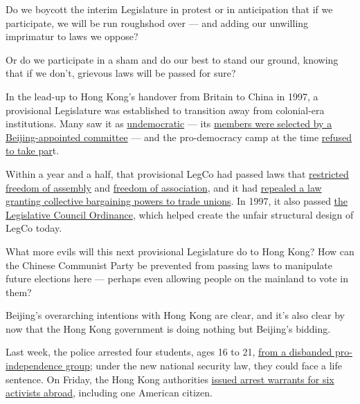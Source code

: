 Do we boycott the interim Legislature in protest or in anticipation that
if we participate, we will be run roughshod over --- and adding our
unwilling imprimatur to laws we oppose?

Or do we participate in a sham and do our best to stand our ground,
knowing that if we don't, grievous laws will be passed for sure?

In the lead-up to Hong Kong's handover from Britain to China in 1997, a
provisional Legislature was established to transition away from
colonial-era institutions. Many saw it as
\href{https://www.hrw.org/legacy/press/pro-legi.htm}{undemocratic} ---
its
\href{https://www.scmp.com/news/hong-kong/education-community/article/2012978/explained-how-hong-kongs-legislative-council-has}{members
were selected by a Beijing-appointed committee} --- and the
pro-democracy camp at the time
\href{http://www.ipsnews.net/1996/12/hong-kong-two-legislatures-one-in-hong-kong-one-in-shenzhen/}{refused
to take par}t.

Within a year and a half, that provisional LegCo had passed laws that
\href{https://www.justicecentre.org.hk/framework/uploads/2018/11/HKUPR-Coalition-Fact-Sheet-Freedom-of-Assembly-Rights-and-Public-Order-Ordinance.pdf}{restricted
freedom of assembly} and
\href{https://hongkongfp.com/2018/07/19/explainer-hong-kong-seeking-ban-pro-independence-party-using-existing-national-security-laws/}{freedom
of association}, and it had
\href{https://www.legco.gov.hk/yr98-99/chinese/hc/papers/hc2711-m1-ec.pdf}{repealed
a law granting collective bargaining powers to trade unions}. In 1997,
it also passed
\href{https://www.legco.gov.hk/general/chinese/procedur/companion/chapter_3/mcp-part1-ch3-n11-ce.pdf}{the
Legislative Council Ordinance}, which helped create the unfair
structural design of LegCo today.

What more evils will this next provisional Legislature do to Hong Kong?
How can the Chinese Communist Party be prevented from passing laws to
manipulate future elections here --- perhaps even allowing people on the
mainland to vote in them?

Beijing's overarching intentions with Hong Kong are clear, and it's also
clear by now that the Hong Kong government is doing nothing but
Beijing's bidding.

Last week, the police arrested four students, ages 16 to 21,
\href{https://www.scmp.com/news/hong-kong/law-and-crime/article/3095240/least-three-core-members-hong-kong-pro-independence}{from
a disbanded pro-independence group}; under the new national security
law, they could face a life sentence. On Friday, the Hong Kong
authorities
\href{https://www.nytimes.com/reuters/2020/07/31/world/asia/31reuters-hongkong-security-exiles.html?searchResultPosition=9}{issued
arrest warrants for six activists abroad}, including one American
citizen.

